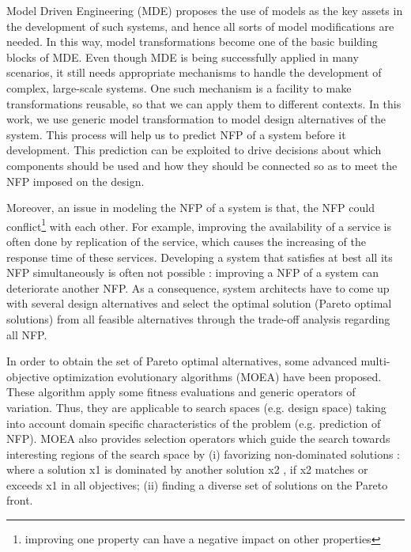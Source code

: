 \documentclass[conference]{IEEEtran}
\begin{document}
Model Driven Engineering (MDE) proposes the use of models as the key assets in the development of such systems, and hence all sorts of model modifications are needed. In this way, model transformations become one of the basic building blocks of MDE. Even though MDE is being successfully applied in many scenarios, it still needs appropriate mechanisms to handle the development of complex, large-scale systems. One such mechanism is a facility to make transformations reusable, so that we can apply them to different contexts. In this work, we use generic model transformation to model design alternatives of the system. This process will help us to predict NFP of a system before it development\cite{1291833}. This prediction can be exploited to drive decisions about which components should be used and how they should be connected so as to meet the NFP imposed on the design.

Moreover, an issue in modeling the NFP of a system is that, the NFP could conflict\footnote{improving one property can have a negative impact on other properties} with each other. For example, improving the availability of a service is often done by replication of the service, which causes the increasing of the response time of these services\cite{Yu:2001:CLA:502059.502038}. Developing a system that satisfies at best all its NFP simultaneously is often not possible : improving a NFP of a system can deteriorate another NFP. As a consequence, system architects have to come up with several design alternatives and select the optimal solution (Pareto optimal solutions) from all feasible alternatives through the trade-off analysis regarding all NFP\cite{Coello98acomprehensive}.

In order to obtain the set of Pareto optimal alternatives, some advanced multi-objective optimization evolutionary algorithms (MOEA) have been proposed. These algorithm apply some fitness evaluations and generic operators of variation. Thus, they are applicable to search spaces (e.g. design space) taking into account domain specific characteristics of the problem (e.g. prediction of NFP). MOEA also provides selection operators which guide the search towards interesting regions of the search space by (i) favorizing non-dominated solutions : where a solution x1 is dominated by another solution x2 , if x2 matches or exceeds x1 in all objectives; (ii) finding a diverse set of solutions on the Pareto front.
\end{document}
